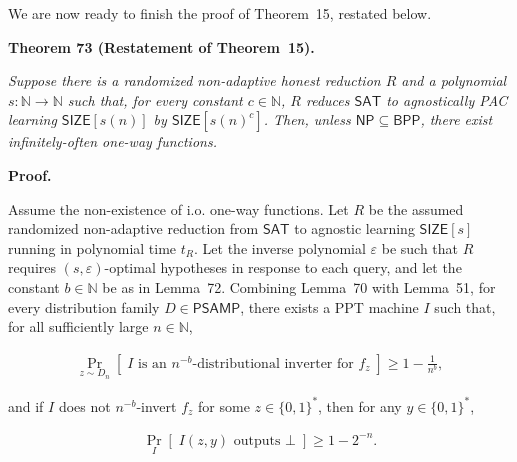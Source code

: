 \documentclass[10pt,a4paper]{article}
\begin{document}
We are now ready to finish the proof of Theorem 15, restated below.\par





\par\medskip\noindent\textbf{
\textbf{Theorem 73}\textbf{ }(Restatement of Theorem 15)\textbf{.}
}\par



\emph{Suppose there is a randomized non-adaptive honest reduction $R$ and a polynomial $s:\mathbb{N}\to\mathbb{N}$ such that, for every constant $c\in\mathbb{N}$, $R$ reduces ${\mathsf{SAT}}$ to agnostically PAC learning ${\mathsf{SIZE}}[s(n)]$ by ${\mathsf{SIZE}}[s(n)^{c}]$. Then, unless ${\mathsf{NP}}\subseteq{\mathsf{BPP}}$, there exist infinitely-often one-way functions.}\par







\par\medskip\noindent\textbf{Proof.}\par




Assume the non-existence of i.o. one-way functions. Let $R$ be the assumed randomized non-adaptive reduction from ${\mathsf{SAT}}$ to agnostic learning ${\mathsf{SIZE}}[s]$ running in polynomial time $t_{R}$. Let the inverse polynomial $\varepsilon$ be such that $R$ requires $(s,\varepsilon)$-optimal hypotheses in response to each query, and let the constant $b\in\mathbb{N}$ be as in Lemma 72. Combining Lemma 70 with Lemma 51, for every distribution family $D\in{\mathsf{P}}{\mathsf{SAMP}}$, there exists a PPT machine $I$ such that, for all sufficiently large $n\in\mathbb{N}$,\par


\[\begin{gathered}
\Pr_{z\sim D_{n}}[\;I\text{ is an }n^{-b}\text{-distributional inverter for }f_{z}\;]\geq 1-\frac{1}{n^{b}},
\end{gathered}\]


and if $I$ does not $n^{-b}$-invert $f_{z}$ for some $z\in\{0,1\}^{*}$, then for any $y\in\{0,1\}^{*}$,\par


\[\begin{gathered}
\Pr_{I}[\;I(z,y)\text{ outputs }\bot\;]\geq 1-2^{-n}.
\end{gathered}\]
\end{document}
